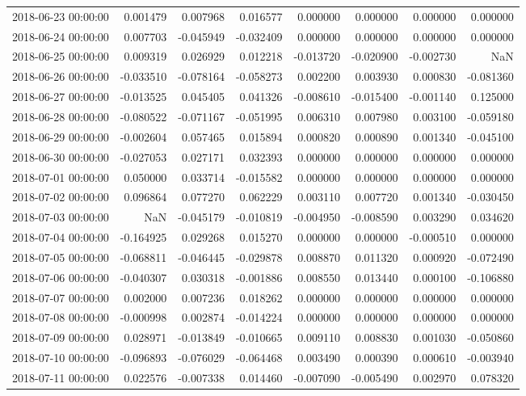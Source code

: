 \begin{tabular}{lrrrrrrr}
2018-06-23 00:00:00 & 0.001479 & 0.007968 & 0.016577 & 0.000000 & 0.000000 & 0.000000 & 0.000000 \\
2018-06-24 00:00:00 & 0.007703 & -0.045949 & -0.032409 & 0.000000 & 0.000000 & 0.000000 & 0.000000 \\
2018-06-25 00:00:00 & 0.009319 & 0.026929 & 0.012218 & -0.013720 & -0.020900 & -0.002730 & NaN \\
2018-06-26 00:00:00 & -0.033510 & -0.078164 & -0.058273 & 0.002200 & 0.003930 & 0.000830 & -0.081360 \\
2018-06-27 00:00:00 & -0.013525 & 0.045405 & 0.041326 & -0.008610 & -0.015400 & -0.001140 & 0.125000 \\
2018-06-28 00:00:00 & -0.080522 & -0.071167 & -0.051995 & 0.006310 & 0.007980 & 0.003100 & -0.059180 \\
2018-06-29 00:00:00 & -0.002604 & 0.057465 & 0.015894 & 0.000820 & 0.000890 & 0.001340 & -0.045100 \\
2018-06-30 00:00:00 & -0.027053 & 0.027171 & 0.032393 & 0.000000 & 0.000000 & 0.000000 & 0.000000 \\
2018-07-01 00:00:00 & 0.050000 & 0.033714 & -0.015582 & 0.000000 & 0.000000 & 0.000000 & 0.000000 \\
2018-07-02 00:00:00 & 0.096864 & 0.077270 & 0.062229 & 0.003110 & 0.007720 & 0.001340 & -0.030450 \\
2018-07-03 00:00:00 & NaN & -0.045179 & -0.010819 & -0.004950 & -0.008590 & 0.003290 & 0.034620 \\
2018-07-04 00:00:00 & -0.164925 & 0.029268 & 0.015270 & 0.000000 & 0.000000 & -0.000510 & 0.000000 \\
2018-07-05 00:00:00 & -0.068811 & -0.046445 & -0.029878 & 0.008870 & 0.011320 & 0.000920 & -0.072490 \\
2018-07-06 00:00:00 & -0.040307 & 0.030318 & -0.001886 & 0.008550 & 0.013440 & 0.000100 & -0.106880 \\
2018-07-07 00:00:00 & 0.002000 & 0.007236 & 0.018262 & 0.000000 & 0.000000 & 0.000000 & 0.000000 \\
2018-07-08 00:00:00 & -0.000998 & 0.002874 & -0.014224 & 0.000000 & 0.000000 & 0.000000 & 0.000000 \\
2018-07-09 00:00:00 & 0.028971 & -0.013849 & -0.010665 & 0.009110 & 0.008830 & 0.001030 & -0.050860 \\
2018-07-10 00:00:00 & -0.096893 & -0.076029 & -0.064468 & 0.003490 & 0.000390 & 0.000610 & -0.003940 \\
2018-07-11 00:00:00 & 0.022576 & -0.007338 & 0.014460 & -0.007090 & -0.005490 & 0.002970 & 0.078320 \\

\end{tabular}

